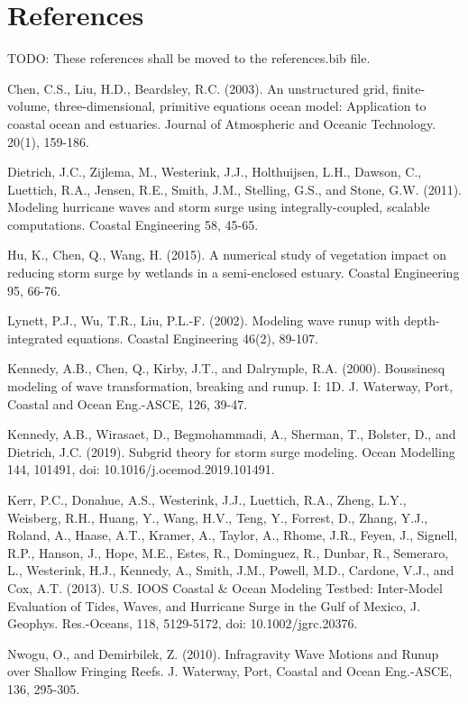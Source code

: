 \section{References}

TODO: These references shall be moved to the references.bib file.

Chen, C.S., Liu, H.D., Beardsley, R.C. (2003). An unstructured grid, finite-volume, three-dimensional, primitive equations ocean model: Application to coastal ocean and estuaries. Journal of Atmospheric and Oceanic Technology. 20(1), 159-186.

Dietrich, J.C., Zijlema, M., Westerink, J.J., Holthuijsen, L.H., Dawson, C., Luettich, R.A., Jensen, R.E., Smith, J.M., Stelling, G.S., and Stone, G.W. (2011). Modeling hurricane waves and storm surge using integrally-coupled, scalable computations. Coastal Engineering 58, 45-65. 

Hu, K., Chen, Q., Wang, H. (2015). A numerical study of vegetation impact on reducing storm surge by wetlands in a semi-enclosed estuary. Coastal Engineering 95, 66-76.

Lynett, P.J., Wu, T.R., Liu, P.L.-F. (2002). Modeling wave runup with depth-integrated equations. Coastal Engineering 46(2), 89-107.

Kennedy, A.B., Chen, Q., Kirby, J.T., and Dalrymple, R.A. (2000). Boussinesq modeling of wave transformation, breaking and runup. I: 1D. J. Waterway, Port, Coastal and Ocean Eng.-ASCE, 126, 39-47.

Kennedy, A.B., Wirasaet, D., Begmohammadi, A., Sherman, T., Bolster, D., and Dietrich, J.C. (2019). Subgrid theory for storm surge modeling. Ocean Modelling 144, 101491, doi: 10.1016/j.ocemod.2019.101491.

Kerr, P.C., Donahue, A.S., Westerink, J.J., Luettich, R.A., Zheng, L.Y., Weisberg, R.H., Huang, Y., Wang, H.V., Teng, Y., Forrest, D., Zhang, Y.J., Roland, A., Haase, A.T., Kramer, A., Taylor, A., Rhome, J.R., Feyen, J., Signell, R.P., Hanson, J., Hope, M.E., Estes, R., Dominguez, R., Dunbar, R., Semeraro, L., Westerink, H.J., Kennedy, A., Smith, J.M., Powell, M.D., Cardone, V.J., and Cox, A.T. (2013). U.S. IOOS Coastal & Ocean Modeling Testbed: Inter-Model Evaluation of Tides, Waves, and Hurricane Surge in the Gulf of Mexico, J. Geophys. Res.-Oceans, 118, 5129-5172, doi: 10.1002/jgrc.20376.

Nwogu, O., and Demirbilek, Z. (2010). Infragravity Wave Motions and Runup over Shallow Fringing Reefs. J. Waterway, Port, Coastal and Ocean Eng.-ASCE, 136, 295-305. 

